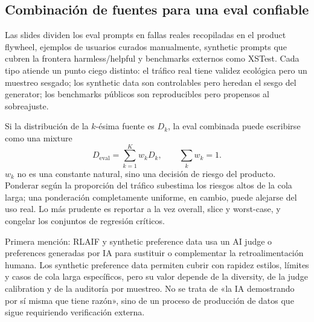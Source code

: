 
\subsection{Combinación de fuentes para una eval confiable}

Las slides dividen los eval prompts en fallas reales recopiladas en el product flywheel, ejemplos de usuarios curados manualmente, synthetic prompts que cubren la frontera harmless/helpful y benchmarks externos como XSTest. Cada tipo atiende un punto ciego distinto: el tráfico real tiene validez ecológica pero un muestreo sesgado; los synthetic data son controlables pero heredan el sesgo del generator; los benchmarks públicos son reproducibles pero propensos al sobreajuste.


Si la distribución de la $k$-ésima fuente es $D_k$, la eval combinada puede escribirse como una mixture
\[
D_{\text{eval}}=\sum_{k=1}^{K}w_kD_k,
\qquad \sum_k w_k=1.
\]
$w_k$ no es una constante natural, sino una decisión de riesgo del producto. Ponderar según la proporción del tráfico subestima los riesgos altos de la cola larga; una ponderación completamente uniforme, en cambio, puede alejarse del uso real. Lo más prudente es reportar a la vez overall, slice y worst-case, y congelar los conjuntos de regresión críticos.

\begin{knowledgebox}{Primera mención: RLAIF y synthetic preference data}
 usa un AI judge o preferences generadas por IA para sustituir o complementar la retroalimentación humana. Los synthetic preference data permiten cubrir con rapidez estilos, límites y casos de cola larga específicos, pero su valor depende de la diversity, de la judge calibration y de la auditoría por muestreo. No se trata de «la IA demostrando por sí misma que tiene razón», sino de un proceso de producción de datos que sigue requiriendo verificación externa.
\end{knowledgebox}


